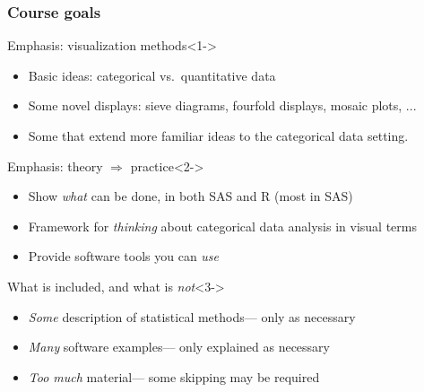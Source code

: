 \renewcommand{\FileName}{goals}

\begin{frame}
  \frametitle{Course goals}
  \begin{block}{Emphasis: visualization methods}<1->
     \begin{itemize}
      \item Basic ideas: categorical vs.\ quantitative data
      \item Some novel displays: sieve diagrams, fourfold displays, mosaic plots, ...
      \item Some that extend more familiar ideas to the categorical data setting.
     \end{itemize}
  \end{block}

  \begin{block}{Emphasis: theory $\Rightarrow$ practice}<2->
     \begin{itemize}
      \item Show \emph{what} can be done, in both SAS and R (most in SAS)
      \item Framework for \emph{thinking} about categorical data analysis in visual terms
      \item Provide software tools you can \emph{use}
     \end{itemize}
  \end{block}

  \begin{block}{What is included, and what is \textit{not}}<3->
     \begin{itemize}
      \item \emph{Some} description of statistical methods--- only as necessary
      \item \emph{Many} software examples--- only explained as necessary
      \item \emph{Too much} material--- some skipping may be required
     \end{itemize}   
  \end{block}

\end{frame}

